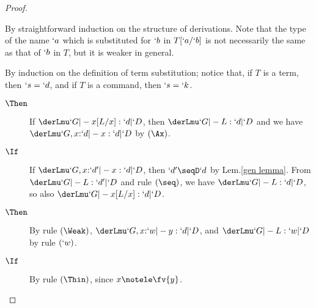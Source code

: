 \documentclass{lmcs}
\begin{document}
 \begin{proof} 

 \begin{enumerate} \itemsep 3pt

\firstitem %
By straightforward induction on the structure of derivations. 
Note that the type of the name $`a$ which is substituted for $`b$ in $T[`a/`b]$ is not necessarily the same as that of $`b$ in $T$, but it is weaker in general.

 \item %
By induction on the definition of term substitution; notice that, if $T$ is a term, then $`s = `d$, and if $T$ is a command, then $`s = `k$.

 \begin{description} \itemsep 3pt

 \item [$ T\same x $] 
 \begin {description} 

 \item [$ \Then $] 
If $ \derLmu `G |- x[L/x] : `d | `D $, then $ \derLmu `G |- L : `d | `D $ and we have $ \derLmu `G,x{:}`d |- x : `d | `D $ by $(\Ax)$.

 \item [$ \If $] 
If $ \derLmu `G,x{:}`d' |- x : `d | `D $, then $`d' \seqD `d$ by Lem.\skp\ref{gen lemma}.
From $\derLmu `G |- L : `d' | `D $ and rule $(\seq)$, we have $ \derLmu `G |- L : `d | `D $, so also $ \derLmu `G |- x[L/x] : `d | `D $.

 \end {description}

 \item [$ T\same y\not= x $] 
 \begin {description}
 \item [$ \Then $] By rule $(\Weak)$, $ \derLmu `G,x{:}`w |- y : `d | `D $, and $ \derLmu `G |- L : `w | `D $ by rule $(`w)$.
 \item [$ \If $] By rule $(\Thin)$, since $x \notele \fv{y}$.
 \end {description}


\end{description}
\end{enumerate}
\end{proof}
\end{document}
